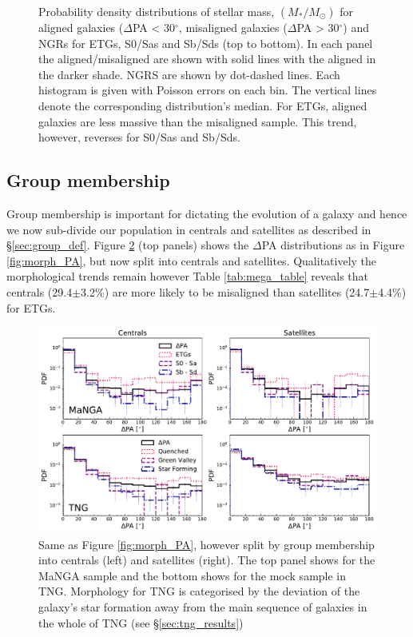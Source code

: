 \documentclass[fleqn,usenatbib]{mnras}
\begin{document}
\begin{figure}
    \caption{Probability density distributions of stellar mass, $(M_{\ast}/M_{\odot})$ for aligned galaxies ($\Delta$PA < 30$^{\circ}$, misaligned galaxies ($\Delta$PA > 30$^{\circ}$) and NGRs for ETGs, S0/Sas and Sb/Sds (top to bottom). In each panel the aligned/misaligned are shown with solid lines with the aligned in the darker shade. NGRS are shown by dot-dashed lines. Each histogram is given with Poisson errors on each bin. The vertical lines denote the corresponding distribution's median. For ETGs, aligned galaxies are less massive than the misaligned sample. This trend, however, reverses for S0/Sas and Sb/Sds.}
    \label{fig:morph_stelM}
\end{figure}

\subsection{Group membership}
Group membership is important for dictating the evolution of a galaxy and hence we now sub-divide our population in centrals and satellites as described in \S\ref{sec:group_def}. Figure \ref{fig:group_morph_PA} (top panels) shows the $\Delta$PA distributions as in Figure \ref{fig:morph_PA}, but now split into centrals and satellites. Qualitatively the morphological trends remain however Table \ref{tab:mega_table} reveals that centrals (29.4$\pm$3.2\%) are more likely to be misaligned than satellites (24.7$\pm$4.4\%) for ETGs. 

\begin{figure}
	\includegraphics[width=\linewidth]{total_pop/MPL8_TNG_morph_group_PA.pdf}
    \caption{Same as Figure \ref{fig:morph_PA}, however split by group membership into centrals (left) and satellites (right). The top panel shows for the MaNGA sample and the bottom shows for the mock sample in TNG. Morphology for TNG is categorised by the deviation of the galaxy's star formation away from the main sequence of galaxies in the whole of TNG (see \S\ref{sec:tng_results})}
    \label{fig:group_morph_PA}
\end{figure}
\end{document}
